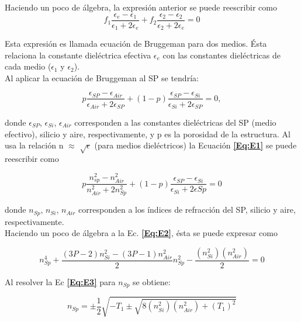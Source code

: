 \documentclass[a4paper,11pt,]{book}
\begin{document}
Haciendo un poco de álgebra, la expresión anterior se puede reescribir como
\begin{equation}
f_1 \frac{\epsilon_e - \epsilon_1}{\epsilon_1 + 2 \epsilon_e} + f_2 \frac{ \epsilon_2 - \epsilon_2 } {\epsilon_2+ 2\epsilon_e} =0 
\end{equation}



Esta expresión es llamada ecuación de Bruggeman para dos medios. Ésta relaciona la constante dieléctrica efectiva $\epsilon_e$ con las constantes dieléctricas de cada medio ($\epsilon_1$ y $\epsilon_2$).\\
Al aplicar la ecuación de Bruggeman al SP se tendría:

\begin{equation}\label{Eq:E1}
p \frac{\epsilon_{SP} - \epsilon_{Air}} {\epsilon_{Air}+2 \epsilon_{SP}} + (1-p) \frac {\epsilon_{SP} - \epsilon_{Si}} {\epsilon_{Si} +2\epsilon_{SP}} =0 ,
\end{equation}

donde $\epsilon_{SP}$, $\epsilon_{Si}$, $ \epsilon_{Air}$ corresponden a las constantes dieléctricas del SP (medio efectivo), silicio y aire, respectivamente, y p es la porosidad de la estructura. Al usa la relación n $\approx$ $\sqrt{\epsilon}$ (para medios dieléctricos) la Ecuación \textbf{\ref{Eq:E1}} se puede reescribir como

\begin{equation}\label{Eq:E2}
p \frac{n^{2}_{sp} - n^{2}_{Air}}{n^{2}_{Air} + 2 n^{2}_{Sp}} + (1-p) \frac{\epsilon_{SP} - \epsilon_{Si}}{\epsilon_{Si} +2\epsilon{Sp}}=0
\end{equation}


donde $n_{Sp}$, $n_{Si}$,  $n_{Air}$ corresponden a los índices de refracción del SP, silicio y aire, respectivamente. \\
Haciendo un poco de álgebra a la Ec. \textbf{\ref{Eq:E2}}, ésta se puede expresar como

\begin{equation}\label{Eq:E3}
n^{4}_{Sp} + \frac {(3P-2) n^{2}_{Si} - (3P-1) n^{2}_{Air}}{2} n^{2}_{Sp} - \frac{(n^{2}_{Si})(n^{2}_{Air})}{2}=0
\end{equation}

Al resolver la Ec \textbf{\ref{Eq:E3}} para $n_{Sp}$ se obtiene:

\begin{equation}\label{Eq:E4}
n_{Sp}= \pm \frac{1}{2} \sqrt{-T_1 \pm \sqrt{8(n^{2}_{Si})(n^{2}_{Air}) + (T_1)^{2}}}
\end{equation}
\end{document}
